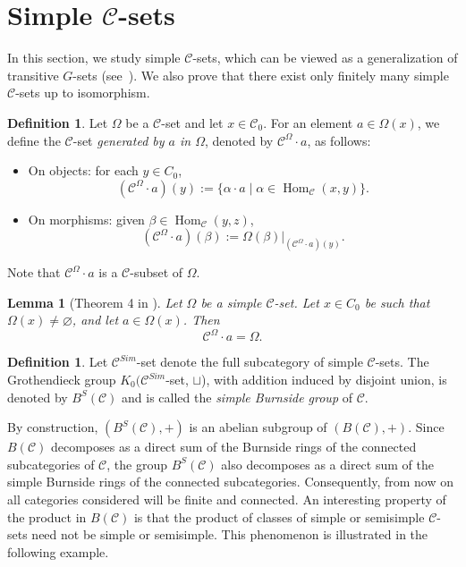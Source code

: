 \documentclass[a4paper]{article}
\newtheorem{lem}[thm]{Lemma}
\theoremstyle{definition}
\newtheorem{defi}[thm]{Definition}
\theoremstyle{remark}
\newcommand*{\cat}[1]{\mathcal{#1}}
\newcommand*{\obj}[1]{#1_0}
\newcommand*{\Hom}[3]{\operatorname{Hom}_{\cat{#1}} \left(#2, #3\right)}
\begin{document}
\section{Simple $\cat{C}$-sets}\label{simple y semisimple}
In this section, we study simple $\cat{C}$-sets, which can be viewed as a generalization of transitive $G$-sets (see~\cite{semisimple}). We also prove that there exist only finitely many simple $\cat{C}$-sets up to isomorphism.
\begin{defi}
Let $\Omega$ be a $\cat{C}$-set and let $x \in \cat{C}_0$. For an element $a \in \Omega(x)$, we define the $\cat{C}$-set \emph{generated by $a$ in $\Omega$}, denoted by $\cat{C}^\Omega \cdot a$, as follows:
\begin{itemize}
    \item On objects: for each $y \in \obj{C}$,
    \[
    (\cat{C}^\Omega \cdot a)(y)
    :=
    \{\alpha \cdot a \mid \alpha \in \Hom{C}{x}{y}\}.
    \]

    \item On morphisms: given $\beta \in \Hom{C}{y}{z}$,
    \[
    (\cat{C}^\Omega \cdot a)(\beta)
    :=
    \Omega(\beta)\big|_{(\cat{C}^\Omega \cdot a)(y)}.
    \]
\end{itemize}

Note that $\cat{C}^\Omega \cdot a$ is a $\cat{C}$-subset of $\Omega$.
\end{defi}

\begin{lem}[Theorem 4 in \cite{semisimple}]\label{orbita simple}
    Let $\Omega$ be a simple $\cat{C}$-set. Let $x\in\obj{C}$ be such that
$\Omega(x)\neq\varnothing$, and let $a\in\Omega(x)$. Then
\[
    \cat{C}^\Omega \cdot a = \Omega.
\]
\end{lem}
\begin{defi}
Let $\cat{C}^{Sim}$-set denote the full subcategory of simple $\cat{C}$-sets. The Grothendieck group $K_0(\cat{C}^{Sim}$-set, $\sqcup$), with addition induced by disjoint union, is denoted by $B^S(\cat{C})$ and is called the \emph{simple Burnside group} of $\cat{C}$.
\end{defi}

By construction, $(B^S(\cat{C}),+)$ is an abelian subgroup of $(B(\cat{C}),+)$. Since $B(\cat{C})$ decomposes as a direct sum of the Burnside rings of the connected subcategories of $\cat{C}$, the group $B^S(\cat{C})$ also decomposes as a direct sum of the simple Burnside rings of the connected subcategories. Consequently, from now on all categories considered will be finite and connected.
An interesting property of the product in $B(\cat{C})$ is that the product of classes of simple or semisimple $\cat{C}$-sets need not be simple or semisimple. This phenomenon is illustrated in the following example.
\end{document}
